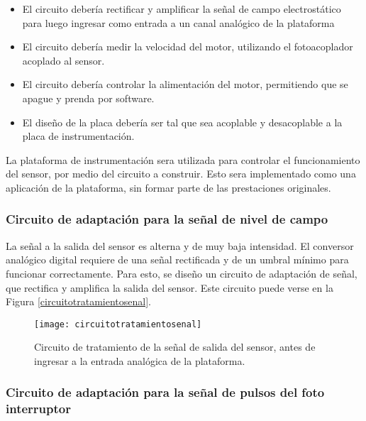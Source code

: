 \begin{itemize}
    \item El circuito debería rectificar y amplificar la señal de campo electrostático para luego ingresar como entrada a un canal analógico de la plataforma
    \item El circuito debería medir la velocidad del motor, utilizando el fotoacoplador acoplado al sensor.
    \item El circuito debería controlar la alimentación del motor, permitiendo que se apague y prenda por software.
    \item El diseño de la placa debería ser tal que sea acoplable y desacoplable a la placa de instrumentación.
\end{itemize}

La plataforma de instrumentación sera utilizada para controlar el funcionamiento del sensor, por medio del circuito a construir. Esto sera implementado como una aplicación de la plataforma, sin formar parte de las prestaciones originales.


\subsubsection{Circuito de adaptación para la señal de nivel de campo} %
\label{it6:ssub:circuito_de_adaptacion_para_la_señal_de_nivel_de_campo}

La señal a la salida del sensor es alterna y de muy baja intensidad. El conversor analógico digital requiere de una señal rectificada y de un umbral mínimo para funcionar correctamente. Para esto, se diseño un circuito de adaptación de señal, que rectifica y amplifica la salida del sensor. Este circuito puede verse en la Figura \ref{circuitotratamientosenal}.  

\begin{figure}[h]
  \centering
  \texttt{[image: circuitotratamientosenal]}
  \caption{Circuito de tratamiento de la señal de salida del sensor, antes de ingresar a la entrada analógica de la plataforma.}\label{fig:circuitotratamientosenal}
\end{figure}




\subsubsection{Circuito de adaptación para la señal de pulsos del foto interruptor} %
\label{it6:ssub:circuito_de_adaptacion_para_la_señal_de_pulsos_del_fotointerruptor}


